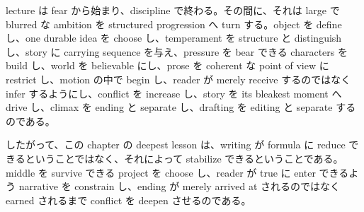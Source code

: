 lecture は fear から始まり、discipline で終わる。その間に、それは large で blurred な ambition を structured progression へ turn する。object を define し、one durable idea を choose し、temperament を structure と distinguish し、story に carrying sequence を与え、pressure を bear できる characters を build し、world を believable にし、prose を coherent な point of view に restrict し、motion の中で begin し、reader が merely receive するのではなく infer するようにし、conflict を increase し、story を its bleakest moment へ drive し、climax を ending と separate し、drafting を editing と separate するのである。

したがって、この chapter の deepest lesson は、writing が formula に reduce できるということではなく、それによって stabilize できるということである。middle を survive できる project を choose し、reader が true に enter できるよう narrative を constrain し、ending が merely arrived at されるのではなく earned されるまで conflict を deepen させるのである。